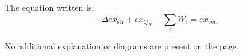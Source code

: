 The equation written is:  
\[
- \Delta ex_{\text{str}} + ex_{Q_B} - \sum_{i} \dot{W}_i = ex_{\text{verl}}
\]  

No additional explanation or diagrams are present on the page.
